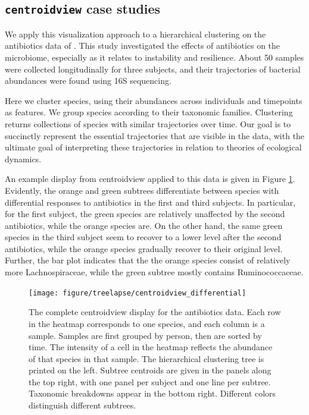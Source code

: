 \subsection{\texttt{centroidview} case studies}

We apply this visualization approach to a hierarchical clustering on the
antibiotics data of \cite{dethlefsen2011incomplete}. This study investigated the
effects of antibiotics on the microbiome, especially as it relates to
instability and resilience. About 50 samples were collected longitudinally for
three subjects, and their trajectories of bacterial abundances were found using
16S sequencing.

Here we cluster species, using their abundances across individuals and
timepoints as features. We group species according to their taxonomic families.
Clustering returns collections of species with similar trajectories over time.
Our goal is to succinctly represent the essential trajectories that are visible
in the data, with the ultimate goal of interpreting these trajectories in
relation to theories of ecological dynamics.

An example display from centroidview applied to this data is given in Figure
\ref{fig:centroidview_differential}. Evidently, the orange and green subtrees
differentiate between species with differential responses to antibiotics in the
first and third subjects. In particular, for the first subject, the green
species are relatively unaffected by the second antibiotics, while the orange
species are. On the other hand, the same green species in the third subject seem
to recover to a lower level after the second antibiotics, while the orange
species gradually recover to their original level. Further, the bar plot
indicates that the the orange species consist of relatively more
Lachnospiraceae, while the green subtree mostly contains Ruminococcaceae.

\begin{figure}
  \centering
  \texttt{[image: figure/treelapse/centroidview\_differential]}
  \caption{
    The complete centroidview display for the antibiotics data. Each row in the
    heatmap corresponds to one species, and each column is a sample. Samples are
    first grouped by person, then are sorted by time. The intensity of a cell in
    the heatmap reflects the abundance of that species in that sample. The
    hierarchical clustering tree is printed on the left. Subtree centroids are
    given in the panels along the top right, with one panel per subject and one
    line per subtree. Taxonomic breakdowns appear in the bottom right. Different
    colors distinguish different subtrees.
    \label{fig:centroidview_differential}
  }
\end{figure}

